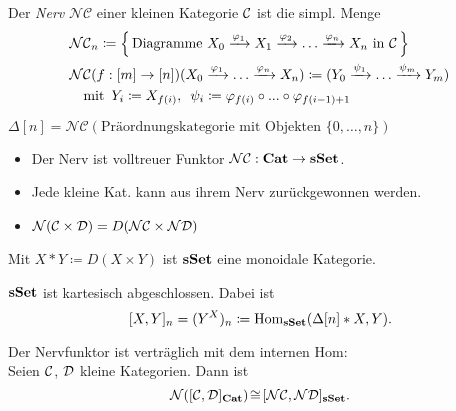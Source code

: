 \documentclass{cheat-sheet}
\newcommand{\NCat}{\mathcal{NC}} %
\newcommand{\Nerve}{\mathcal{N}} %
\begin{document}
\begin{defn}
  Der \emph{Nerv} $\NCat$ einer kleinen Kategorie $\mathcal{C}$ ist die simpl. Menge
  \begin{align*}
    & \NCat_n \coloneqq \left\{ \, \text{Diagramme } X_0 \xrightarrow{\varphi_1} X_1 \xrightarrow{\varphi_2} \ldots \xrightarrow{\varphi_n} X_n \text{ in $\Cat$} \, \right\} \\
    & \NCat(f : [m] \to [n])(X_0 \xrightarrow{\varphi_1} \ldots \xrightarrow{\varphi_n} X_n) \coloneqq
    ( Y_0 \xrightarrow{\psi_1} \ldots \xrightarrow{\psi_m} Y_m) \\
    & \quad \text{mit} \enspace Y_i \coloneqq X_{f(i)}, \enspace \psi_i \coloneqq \varphi_{f(i)} \circ \nldots \circ \varphi_{f(i-1)+1}
  \end{align*}
\end{defn}

\begin{bsp}
 $\Delta[n] = \NCat(\text{Präordnungskategorie mit Objekten } \{ 0, \ldots, n \})$
\end{bsp}

\begin{bem}
  \begin{itemize}
    \item Der Nerv ist volltreuer Funktor $\NCat : \CatC \to \sSet$.
    \item Jede kleine Kat. kann aus ihrem Nerv zurückgewonnen werden.
    \item $\Nerve(\Cat \times \Dat) = D(\Nerve\Cat \times \Nerve\Dat)$
  \end{itemize}
\end{bem}

\begin{bem}
  Mit $X \!*\! Y \coloneqq D(X \!\times\! Y)$ ist $\mathbf{sSet}$ eine monoidale Kategorie.
\end{bem}

\begin{prop}
  $\mathbf{sSet}$ ist kartesisch abgeschlossen. Dabei ist
  \[ [X, Y]_n = (Y^X)_n \coloneqq \operatorname{Hom}_{\mathbf{sSet}}(\Delta[n] * X, Y). \]
\end{prop}

\begin{prop}
  Der Nervfunktor ist verträglich mit dem internen Hom: \\
  Seien $\mathcal{C}$, $\mathcal{D}$ kleine Kategorien. Dann ist
  \[ \Nerve([\Cat, \Dat]_{\CatC}) \!\cong\! [\Nerve\Cat, \Nerve\Dat]_{\sSet}. \]
\end{prop}
\end{document}
